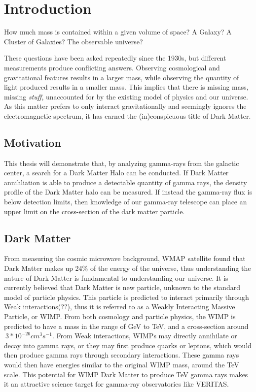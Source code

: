 \cleartooddpage[\thispagestyle{empty}]
\chapter{Introduction}

How much mass is contained within a given volume of space?
A Galaxy?
A Cluster of Galaxies?
The observable universe?

These questions have been asked repeatedly since the 1930s, but different measurements produce conflicting answers.
Observing cosmological and gravitational features results in a larger mass, while observing the quantity of light produced results in a smaller mass.
This implies that there is missing mass, missing \textit{stuff}, unaccounted for by the existing model of physics and our universe.
As this matter prefers to only interact gravitationally and seemingly ignores the electromagnetic spectrum, it has earned the (in)conspicuous title of Dark Matter.

\section{Motivation}
This thesis will demonstrate that, by analyzing gamma-rays from the galactic center, a search for a Dark Matter Halo can be conducted.
If Dark Matter annihliation is able to produce a detectable quantity of gamma rays, the density profile of the Dark Matter halo can be measured.
If instead the gamma-ray flux is below detection limits, then knowledge of our gamma-ray telescope can place an upper limit on the cross-section of the dark matter particle.

\section{Dark Matter}

From measuring the cosmic microwave background, WMAP satellite found that Dark Matter makes up 24\% of the energy of the universe\cite{pdg_2012}, thus understanding the nature of Dark Matter is fundamental to understanding our universe.
It is currently believed that Dark Matter is new particle, unknown to the standard model of particle physics.
This particle is predicted to interact primarily through Weak interactions(??), thus it is referred to as a Weakly Interacting Massive Particle, or WIMP.
From both cosmology and particle physics, the WIMP is predicted to have a mass in the range of GeV to TeV, and a cross-section around $~3*10^{-26} cm^{3}s^{-1}$.
From Weak interactions, WIMPs may directly annihilate or decay into gamma rays, or they may first produce quarks or leptons, which would then produce gamma rays through secondary interactions.
These gamma rays would then have energies similar to the original WIMP mass, around the TeV scale.
This potential for WIMP Dark Matter to produce TeV gamma rays makes it an attractive science target for gamma-ray observatories like VERITAS.

